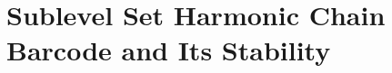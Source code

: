 \documentclass[10pt,a4paper]{amsart}
\theoremstyle{definition}
\newcommand{\fsimp}{\sigma}
\newcommand{\Bnd}{B}
\newcommand{\Cobmat}{\mathtt{Cob}}
\newcommand{\Chnmat}{\mathtt{SC}}
\newcommand{\Bndmat}{\mathtt{BoC}}
\newcommand{\aG}{\alpha}
\newcommand{\sG}{\sigma}
\newcommand{\dG}{\delta}
\newcommand{\gG}{\gamma}
\theoremstyle{remark}
\begin{document}





% 

\section{Sublevel Set Harmonic Chain Barcode and Its Stability}
\label{sec:stability}
\end{document}
